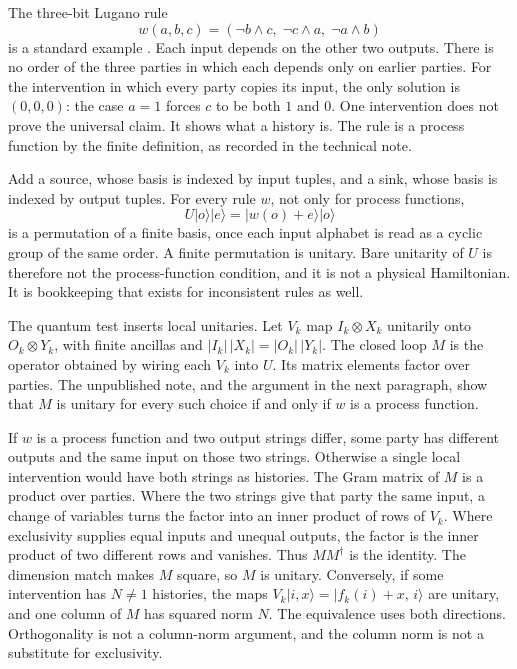 \documentclass[11pt]{article}
\begin{document}
The three-bit Lugano rule
\[
w(a,b,c)=(\lnot b\land c,\;\lnot c\land a,\;\lnot a\land b)
\]
is a standard example \citep{baumeler2016,baumeler2019}. Each input depends on the other two outputs. There is no order of the three parties in which each depends only on earlier parties. For the intervention in which every party copies its input, the only solution is \((0,0,0)\): the case \(a=1\) forces \(c\) to be both \(1\) and \(0\). One intervention does not prove the universal claim. It shows what a history is. The rule is a process function by the finite definition, as recorded in the technical note.

Add a source, whose basis is indexed by input tuples, and a sink, whose basis is indexed by output tuples. For every rule \(w\), not only for process functions,
\[
U\lvert o\rangle\lvert e\rangle=\lvert w(o)+e\rangle\lvert o\rangle
\]
is a permutation of a finite basis, once each input alphabet is read as a cyclic group of the same order. A finite permutation is unitary. Bare unitarity of \(U\) is therefore not the process-function condition, and it is not a physical Hamiltonian. It is bookkeeping that exists for inconsistent rules as well.

The quantum test inserts local unitaries. Let \(V_k\) map \(I_k\otimes X_k\) unitarily onto \(O_k\otimes Y_k\), with finite ancillas and \(|I_k|\,|X_k|=|O_k|\,|Y_k|\). The closed loop \(M\) is the operator obtained by wiring each \(V_k\) into \(U\). Its matrix elements factor over parties. The unpublished note, and the argument in the next paragraph, show that \(M\) is unitary for every such choice if and only if \(w\) is a process function.

If \(w\) is a process function and two output strings differ, some party has different outputs and the same input on those two strings. Otherwise a single local intervention would have both strings as histories. The Gram matrix of \(M\) is a product over parties. Where the two strings give that party the same input, a change of variables turns the factor into an inner product of rows of \(V_k\). Where exclusivity supplies equal inputs and unequal outputs, the factor is the inner product of two different rows and vanishes. Thus \(MM^{\dagger}\) is the identity. The dimension match makes \(M\) square, so \(M\) is unitary. Conversely, if some intervention has \(N\neq 1\) histories, the maps \(V_k\lvert i,x\rangle=\lvert f_k(i)+x,\,i\rangle\) are unitary, and one column of \(M\) has squared norm \(N\). The equivalence uses both directions. Orthogonality is not a column-norm argument, and the column norm is not a substitute for exclusivity.
\end{document}
